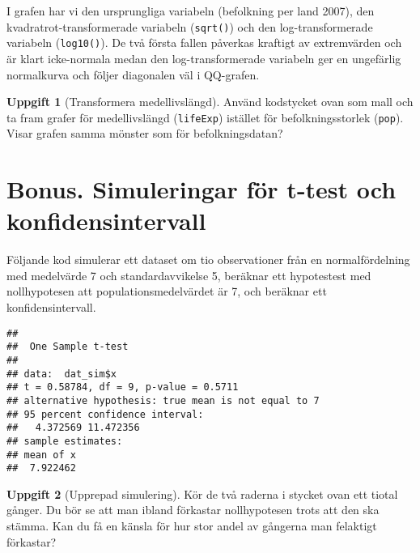 \documentclass[
]{book}
\newenvironment{Shaded}{\begin{snugshade}}{\end{snugshade}}
\newcommand{\AttributeTok}[1]{\textcolor[rgb]{0.77,0.63,0.00}{#1}}
\newcommand{\DecValTok}[1]{\textcolor[rgb]{0.00,0.00,0.81}{#1}}
\newcommand{\FunctionTok}[1]{\textcolor[rgb]{0.00,0.00,0.00}{#1}}
\newcommand{\NormalTok}[1]{#1}
\newcommand{\OtherTok}[1]{\textcolor[rgb]{0.56,0.35,0.01}{#1}}
\newcommand{\SpecialCharTok}[1]{\textcolor[rgb]{0.00,0.00,0.00}{#1}}
\theoremstyle{definition}
\theoremstyle{definition}
\theoremstyle{definition}
\newtheorem{exercise}{Uppgift}[chapter]
\theoremstyle{definition}
\theoremstyle{remark}
\begin{document}
I grafen har vi den ursprungliga variabeln (befolkning per land 2007), den kvadratrot-transformerade variabeln (\texttt{sqrt()}) och den log-transformerade variabeln (\texttt{log10()}). De två första fallen påverkas kraftigt av extremvärden och är klart icke-normala medan den log-transformerade variabeln ger en ungefärlig normalkurva och följer diagonalen väl i QQ-grafen.

\begin{exercise}[Transformera medellivslängd]
Använd kodstycket ovan som mall och ta fram grafer för medellivslängd (\texttt{lifeExp}) istället för befolkningsstorlek (\texttt{pop}). Visar grafen samma mönster som för befolkningsdatan?
\end{exercise}

\hypertarget{bonus.-simuleringar-fuxf6r-t-test-och-konfidensintervall}{%
\section{Bonus. Simuleringar för t-test och konfidensintervall}\label{bonus.-simuleringar-fuxf6r-t-test-och-konfidensintervall}}

Följande kod simulerar ett dataset om tio observationer från en normalfördelning med medelvärde 7 och standardavvikelse 5, beräknar ett hypotestest med nollhypotesen att populationsmedelvärdet är 7, och beräknar ett konfidensintervall.

\begin{Shaded}
\end{Shaded}

\begin{verbatim}
## 
##  One Sample t-test
## 
## data:  dat_sim$x
## t = 0.58784, df = 9, p-value = 0.5711
## alternative hypothesis: true mean is not equal to 7
## 95 percent confidence interval:
##   4.372569 11.472356
## sample estimates:
## mean of x 
##  7.922462
\end{verbatim}

\begin{exercise}[Upprepad simulering]
Kör de två raderna i stycket ovan ett tiotal gånger. Du bör se att man ibland förkastar nollhypotesen trots att den ska stämma. Kan du få en känsla för hur stor andel av gångerna man felaktigt förkastar?
\end{exercise}
\end{document}
